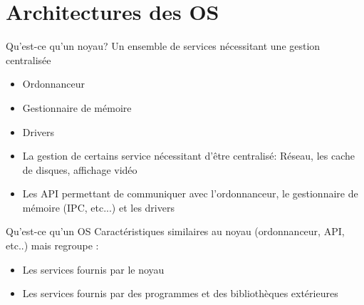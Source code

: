 \part{Architectures des OS}

\begin{frame}
\partpage
\end{frame}


\begin{frame}[fragile=singleslide]{Qu'est-ce qu'un noyau?}
  Un ensemble de services nécessitant une gestion centralisée
  \begin{itemize} 
  \item Ordonnanceur
  \item Gestionnaire de mémoire
  \item Drivers
  \item La gestion de  certains service nécessitant d'être centralisé:
    Réseau, les cache de disques, affichage vidéo
  \item  Les API  permettant  de communiquer  avec l'ordonnanceur,  le
    gestionnaire de mémoire (IPC, etc...) et les drivers
  \end{itemize} 
\end{frame} 

\begin{frame}[fragile=singleslide]{Qu'est-ce qu'un OS}
  Caractéristiques similaires au noyau (ordonnanceur, API, etc..) mais
  regroupe :
  \begin{itemize} 
  \item Les services fournis par le noyau
  \item Les  services fournis par des programmes  et des bibliothèques
    extérieures
  \end{itemize} 
\end{frame}

